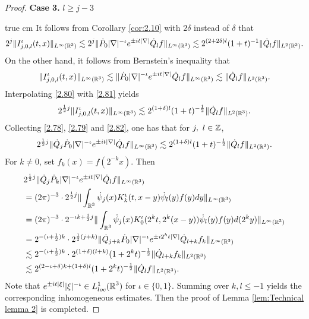 \documentclass[11pt,twoside]{article}
\def\Z{\mathop{\mathbb Z\kern 0pt}\nolimits}
\def\R{\mathop{\mathbb R\kern 0pt}\nolimits}
\def\f{\frac}
\def\ls{\lesssim}
\newcommand{\q}{\dot{Q}}
\theoremstyle{plain}
\theoremstyle{definition}
\numberwithin{equation}{section}
\begin{document}
\begin{proof}
	\noindent	\textbf{Case 3.} $l\ge j-3$

 true cm
		It follows from Corollary \ref{cor:2.10} with $2\delta$ instead of $\delta$ that
		\begin{equation}\label{2.80}
			2^{j}\|I_{j,0,l}^\iota(t,x)\|_{L^\infty(\R^3)}
			\ls	2^{j}\|\dot{P}_0 |\nabla|^{-\iota} e^{\pm it|\nabla|} \q_lf\|_{L^\infty(\R^3)}
			\ls 2^{(2+2\delta)l }(1+t)^{-1}\|\q_lf\|_{L^2(\R^3)}.
		\end{equation}
		On the other hand, it follows from Bernstein's inequality that
		\begin{equation}\label{2.81}
			\|I_{j,0,l}^\iota(t,x)\|_{L^\infty(\R^3)}\ls	\|\dot{P}_0 |\nabla|^{-\iota} e^{\pm it|\nabla|} \q_lf\|_{L^\infty(\R^3)} \ls \|\q_lf\|_{L^2(\R^3)}.
		\end{equation}
		Interpolating \eqref{2.80} with \eqref{2.81} yields
		\begin{equation}\label{2.82}
			2^{\f12 j}\|I_{j,0,l}^\iota(t,x)\|_{L^\infty(\R^3)}
			\ls
			2^{(1+\delta)l}(1+ t)^{-\f12}\|\q_lf\|_{L^2(\R^3)}.
		\end{equation}
		Collecting \eqref{2.78}, \eqref{2.79} and \eqref{2.82}, one has that for $j,\ l\in \Z$,
		\begin{equation*}
			2^{\f12 j}\|\q_j \dot{P}_0 |\nabla|^{-\iota}e^{\pm it|\nabla|}\q_l f\|_{L^\infty(\R^3)}
			\ls
			2^{(1+\delta)l}(1+t)^{-\f12}\|\q_l f\|_{L^2(\R^3)}.
		\end{equation*}
		For $k\not=0$, set $f_k(x) = f(2^{-k}x)$. Then
		\begin{equation*}
			\begin{split}
				&2^{\f12 j}\|\q_j \dot{P}_k |\nabla|^{-\iota}e^{\pm it|\nabla|}\q_l f\|_{L^\infty(\R^3)}\\
				&=(2\pi)^{-3}\cdot2^{\f12 j}\|\int_{\R^3}\dot{\psi}_j(x)K^\iota_k(t,x-y)\dot{\psi}_{l}(y)f(y)dy\|_{L^\infty(\R^3)}\\
				&=(2\pi)^{-3}\cdot2^{-\iota k+\f12 j}\|\int_{\R^3}\dot{\psi}_j(x)K^\iota_0(2^kt,2^k(x-y))\dot{\psi}_{l}(y)f(y)d(2^ky)\|_{L^\infty(\R^3)}\\
				&=2^{-(\iota+\f12) k}\cdot2^{\f12(j+k)}\|\q_{j+k}\dot{P}_0|\nabla|^{-\iota}e^{\pm i2^kt|\nabla|}\q_{l+k}f_k\|_{L^\infty(\R^3)} \\
				&\ls 2^{-(\iota+\f12) k}\cdot2^{(1+\delta)(l+k)}(1+2^kt)^{-\f12}\|\q_{l+k} f_k\|_{L^2(\R^3)}\\
				&\ls 2^{(2-\iota+\delta) k+(1+\delta)l}(1+2^kt)^{-\f12}\|\q_{l} f\|_{L^2(\R^3)}.
			\end{split}
		\end{equation*}
		Note that $e^{\pm it|\xi|}|\xi|^{-\iota}\in L^1_{loc}(\R^3)$ for $\iota\in\{0,1\}$. Summing over $k, l \le -1$ yields the corresponding inhomogeneous estimates. Then the proof of
Lemma \ref{lem:Technical lemma 2} is completed.
	\end{proof}
\end{document}
